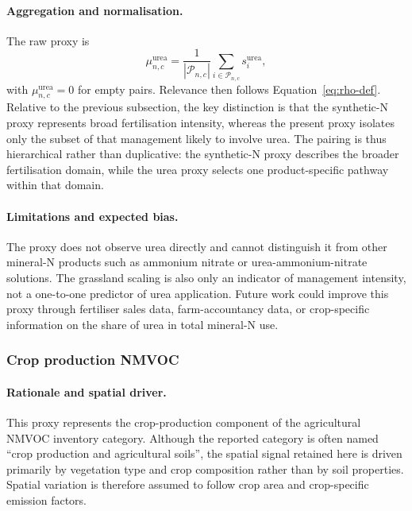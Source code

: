 \paragraph{Aggregation and normalisation.}
The raw proxy is
\begin{equation}
  \mu_{n,c}^{\mathrm{urea}} =
  \frac{1}{|\mathcal{P}_{n,c}|}
  \sum_{i \in \mathcal{P}_{n,c}} s_i^{\mathrm{urea}},
\end{equation}
with $\mu_{n,c}^{\mathrm{urea}}=0$ for empty pairs. Relevance then
follows Equation~\ref{eq:rho-def}. Relative to the previous subsection,
the key distinction is that the synthetic-N proxy represents broad
fertilisation intensity, whereas the present proxy isolates only the
subset of that management likely to involve urea. The pairing is thus
hierarchical rather than duplicative: the synthetic-N proxy describes
the broader fertilisation domain, while the urea proxy selects one
product-specific pathway within that domain.

\paragraph{Limitations and expected bias.}
The proxy does not observe urea directly and cannot distinguish it from
other mineral-N products such as ammonium nitrate or
urea-ammonium-nitrate solutions. The grassland scaling is also only an
indicator of management intensity, not a one-to-one predictor of urea
application. Future work could improve this proxy through fertiliser
sales data, farm-accountancy data, or crop-specific information on the
share of urea in total mineral-N use.

\subsubsection{Crop production NMVOC}
\label{sec:proxy-agsoils-nmvoc}

\paragraph{Rationale and spatial driver.}
This proxy represents the crop-production component of the agricultural
NMVOC inventory category. Although the reported category is often named
``crop production and agricultural soils'', the spatial signal retained
here is driven primarily by vegetation type and crop composition rather
than by soil properties. Spatial variation is therefore assumed to
follow crop area and crop-specific emission factors.

